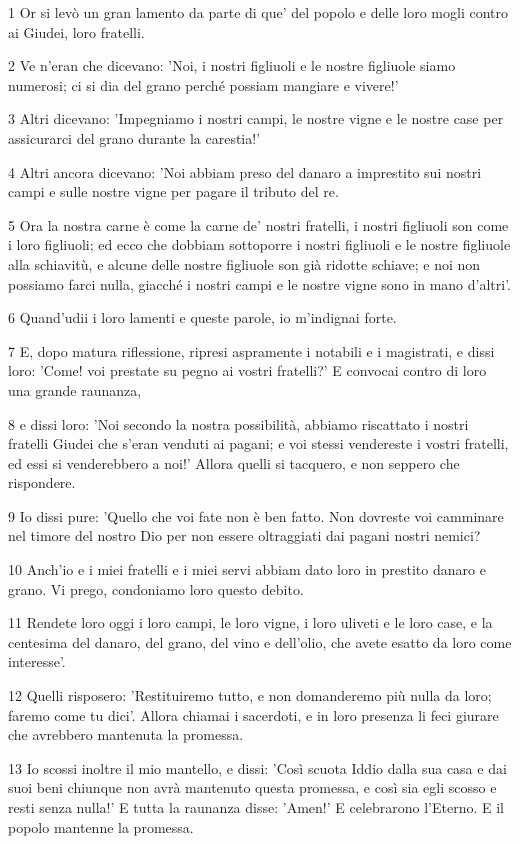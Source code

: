 \par 1 Or si levò un gran lamento da parte di que' del popolo e delle loro mogli contro ai Giudei, loro fratelli.
\par 2 Ve n'eran che dicevano: 'Noi, i nostri figliuoli e le nostre figliuole siamo numerosi; ci si dia del grano perché possiam mangiare e vivere!'
\par 3 Altri dicevano: 'Impegniamo i nostri campi, le nostre vigne e le nostre case per assicurarci del grano durante la carestia!'
\par 4 Altri ancora dicevano: 'Noi abbiam preso del danaro a imprestito sui nostri campi e sulle nostre vigne per pagare il tributo del re.
\par 5 Ora la nostra carne è come la carne de' nostri fratelli, i nostri figliuoli son come i loro figliuoli; ed ecco che dobbiam sottoporre i nostri figliuoli e le nostre figliuole alla schiavitù, e alcune delle nostre figliuole son già ridotte schiave; e noi non possiamo farci nulla, giacché i nostri campi e le nostre vigne sono in mano d'altri'.
\par 6 Quand'udii i loro lamenti e queste parole, io m'indignai forte.
\par 7 E, dopo matura riflessione, ripresi aspramente i notabili e i magistrati, e dissi loro: 'Come! voi prestate su pegno ai vostri fratelli?' E convocai contro di loro una grande raunanza,
\par 8 e dissi loro: 'Noi secondo la nostra possibilità, abbiamo riscattato i nostri fratelli Giudei che s'eran venduti ai pagani; e voi stessi vendereste i vostri fratelli, ed essi si venderebbero a noi!' Allora quelli si tacquero, e non seppero che rispondere.
\par 9 Io dissi pure: 'Quello che voi fate non è ben fatto. Non dovreste voi camminare nel timore del nostro Dio per non essere oltraggiati dai pagani nostri nemici?
\par 10 Anch'io e i miei fratelli e i miei servi abbiam dato loro in prestito danaro e grano. Vi prego, condoniamo loro questo debito.
\par 11 Rendete loro oggi i loro campi, le loro vigne, i loro uliveti e le loro case, e la centesima del danaro, del grano, del vino e dell'olio, che avete esatto da loro come interesse'.
\par 12 Quelli risposero: 'Restituiremo tutto, e non domanderemo più nulla da loro; faremo come tu dici'. Allora chiamai i sacerdoti, e in loro presenza li feci giurare che avrebbero mantenuta la promessa.
\par 13 Io scossi inoltre il mio mantello, e dissi: 'Così scuota Iddio dalla sua casa e dai suoi beni chiunque non avrà mantenuto questa promessa, e così sia egli scosso e resti senza nulla!' E tutta la raunanza disse: 'Amen!' E celebrarono l'Eterno. E il popolo mantenne la promessa.
